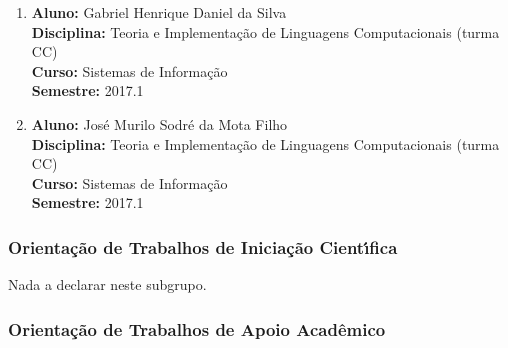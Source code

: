 \documentclass[a4paper,oneside,10pt]{article}
\begin{document}
\begin{enumerate}
\item   \textbf{Aluno:} Gabriel Henrique Daniel da Silva \mbox{} \\
        \textbf{Disciplina:}  Teoria e Implementação de Linguagens Computacionais (turma CC)\\
        \textbf{Curso:} Sistemas de Informação\\
        \textbf{Semestre:} 2017.1

\item   \textbf{Aluno:} José Murilo Sodré da Mota Filho \mbox{} \\
        \textbf{Disciplina:}  Teoria e Implementação de Linguagens Computacionais (turma CC)\\
        \textbf{Curso:} Sistemas de Informação\\
        \textbf{Semestre:} 2017.1

\end{enumerate}


\subsubsection{Orienta\c{c}\~{a}o de Trabalhos de Inicia\c{c}\~{a}o Cient\'{\i}fica}
\vspace{0.3cm}

Nada a declarar neste subgrupo.
%
%


\subsubsection{Orienta\c{c}\~{a}o de Trabalhos de Apoio Acad\^{e}mico}
\vspace{0.3cm}
\end{document}
